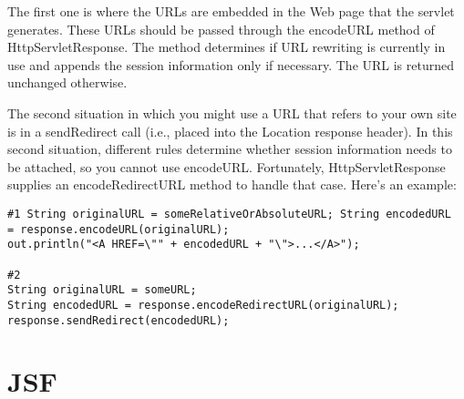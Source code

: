\documentclass[a4paper,10pt]{scrreprt}
\begin{document}
{The first one is where the URLs are embedded in the Web page that the servlet generates. These URLs should be
passed through the encodeURL method of HttpServletResponse. The method determines if URL rewriting is
currently in use and appends the session information only if necessary. The URL is returned unchanged otherwise.

The second situation in which you might use a URL that refers to your own site is in a sendRedirect call (i.e., placed
into the Location response header). In this second situation, different rules determine whether session information
needs to be attached, so you cannot use encodeURL. Fortunately, HttpServletResponse supplies an
encodeRedirectURL method to handle that case. Here’s an example:

\begin{lstlisting}[caption= Java Examples for Encoded URLS]
#1 String originalURL = someRelativeOrAbsoluteURL; String encodedURL
= response.encodeURL(originalURL);
out.println("<A HREF=\"" + encodedURL + "\">...</A>");

#2
String originalURL = someURL;
String encodedURL = response.encodeRedirectURL(originalURL);
response.sendRedirect(encodedURL);
\end{lstlisting}


\chapter{JSF}

}
\end{document}
